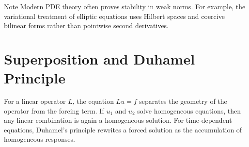 \begin{notebox}{Note}
Modern PDE theory often proves stability in weak norms. For example, the variational treatment of elliptic equations uses Hilbert spaces and coercive bilinear forms rather than pointwise second derivatives.
\end{notebox}

\section{Superposition and Duhamel Principle}

For a linear operator \(L\), the equation \(Lu=f\) separates the geometry of the operator from the forcing term. If \(u_1\) and \(u_2\) solve homogeneous equations, then any linear combination is again a homogeneous solution. For time-dependent equations, Duhamel's principle rewrites a forced solution as the accumulation of homogeneous responses.
